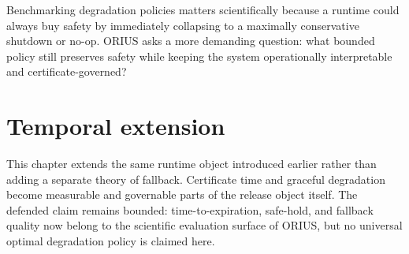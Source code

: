 Benchmarking degradation policies matters scientifically because a runtime could always buy
safety by immediately collapsing to a maximally conservative shutdown or no-op. ORIUS asks a
more demanding question: what bounded policy still preserves safety while keeping the system
operationally interpretable and certificate-governed?

\section{Temporal extension}
This chapter extends the same runtime object introduced earlier rather than adding a separate
theory of fallback. Certificate time and graceful degradation become measurable and governable
parts of the release object itself. The defended claim remains bounded: time-to-expiration,
safe-hold, and fallback quality now belong to the scientific evaluation surface of ORIUS,
but no universal optimal degradation policy is claimed here.
